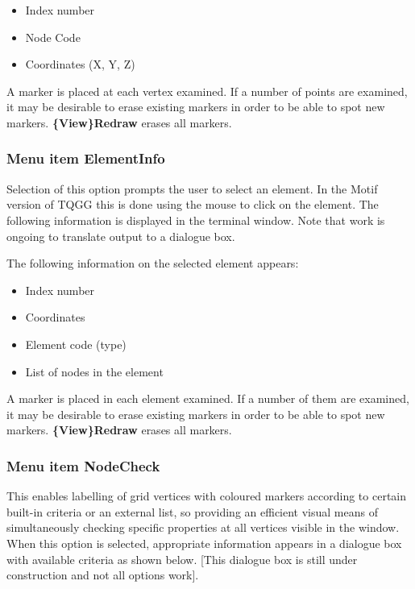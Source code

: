 \documentclass{article}
\begin{document}
\begin{itemize}
\item Index number
\item Node Code
\item Coordinates (X, Y, Z)
\end{itemize}

A marker is placed at each vertex examined. If a number of points are examined, it may be desirable to erase existing markers in order to be able to spot new markers. \textbf{\{View\}Redraw} erases all markers.


\subsubsection{Menu item ElementInfo}
Selection of this option prompts the user to select an element.  In the Motif version of TQGG this is done using the mouse to click on the element.  The following information is displayed in the terminal window.  Note that work is ongoing to translate output to a dialogue box.

The following information on the selected element appears:

\begin{itemize}
\item Index number
\item Coordinates
\item Element code (type)
\item List of nodes in the element 
\end{itemize}
A marker is placed in each element examined. If a number of them are examined, it may be desirable to erase existing markers in order to be able to spot new markers. \textbf{\{View\}Redraw} erases all markers.


\subsubsection{Menu item NodeCheck}
This enables labelling of grid vertices with coloured markers according to certain built-in criteria or an external list, so providing an efficient visual means of simultaneously checking specific properties at all vertices visible in the window. When this option is selected, appropriate information appears in a dialogue box with available criteria as shown below. [This dialogue box is still under construction and not all options work].
\\ \\
\end{document}
